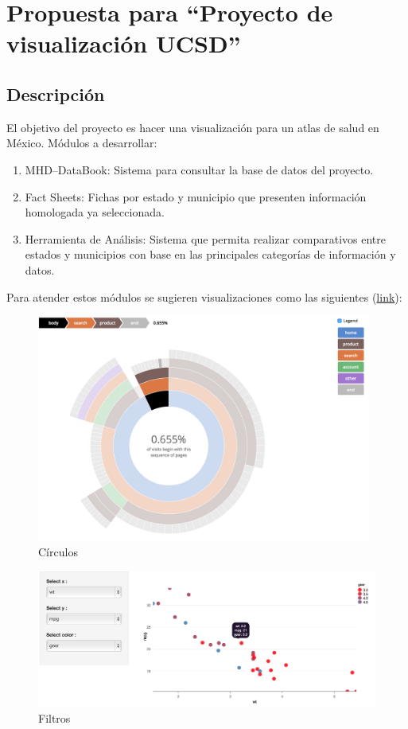 \documentclass[11pt,letterpaper,spanish]{article}
\begin{document}
\section{Propuesta para ``Proyecto  de visualización UCSD''\\ }
\subsection*{Descripción}

El objetivo del proyecto es hacer una visualización para un atlas de salud en México.
Módulos a desarrollar:
\begin{enumerate}
\item MHD–DataBook: Sistema para consultar la base de datos del proyecto.
\item Fact Sheets: Fichas por estado y municipio que presenten información
homologada ya seleccionada.
\item Herramienta de Análisis: Sistema que permita realizar comparativos entre
estados y municipios con base en las principales categorías de información y datos.
\end{enumerate}

Para atender estos módulos se sugieren visualizaciones como las siguientes (\href{http://carlospetricioli.com/propuesta_sigmum}{\color{blue}link}):


\begin{figure}[H]
\caption{Círculos}
\centering
\includegraphics[width=110mm]{../img/circulos.png}
\end{figure}

\begin{figure}[H]
\caption{Filtros}
\centering
\includegraphics[width=150mm]{../img/filtros.png}
\end{figure}
\end{document}
